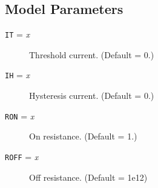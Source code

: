 \subsection{Model Parameters}

\begin{description}

\item[{\tt IT} = {\it x}] Threshold current.  (Default = 0.)

\item[{\tt IH} = {\it x}] Hysteresis current.  (Default = 0.)

\item[{\tt RON} = {\it x}] On resistance.  (Default = 1.)

\item[{\tt ROFF} = {\it x}] Off resistance.  (Default = 1e12)

\end{description}
